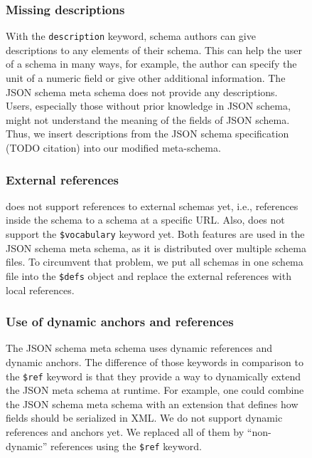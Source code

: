 \begin{figure}[h]
\subsubsection{Missing descriptions}
With the \texttt{description} keyword, schema authors can give descriptions to any elements of their schema.
This can help the user of a schema in many ways, for example, the author can specify the unit of a numeric field or give other additional information.
The JSON schema meta schema does not provide any descriptions.
Users, especially those without prior knowledge in JSON schema, might not understand the meaning of the fields of JSON schema.
Thus, we insert descriptions from the JSON schema specification (TODO citation) into our modified meta-schema.

\subsubsection{External references}
\toolname does not support references to external schemas yet, i.e., references inside the schema to a schema at a specific URL\@.
Also, \toolname does not support the \texttt{\$vocabulary} keyword yet.
Both features are used in the JSON schema meta schema, as it is distributed over multiple schema files.
To circumvent that problem, we put all schemas in one schema file into the \texttt{\$defs} object and replace the external references with local references.

\subsubsection{Use of dynamic anchors and references}
The JSON schema meta schema uses dynamic references and dynamic anchors.
The difference of those keywords in comparison to the \texttt{\$ref} keyword is that they provide a way to dynamically extend the JSON meta schema
at runtime.
For example, one could combine the JSON schema meta schema with an extension that defines how fields should be serialized in XML\@.
We do not support dynamic references and anchors yet.
We replaced all of them by ``non-dynamic'' references using the \texttt{\$ref} keyword.


\end{figure}
